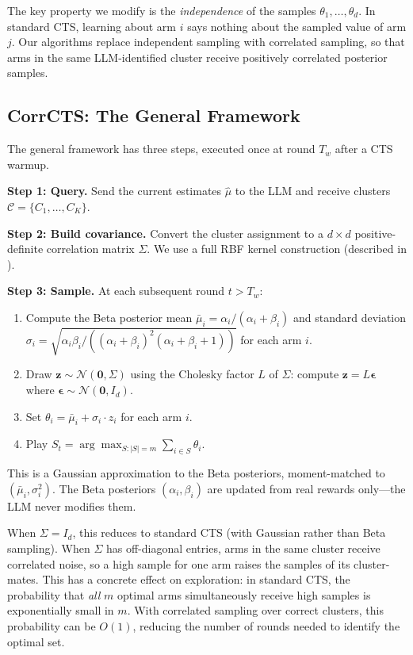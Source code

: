 \documentclass{article}
\theoremstyle{plain}
\theoremstyle{definition}
\theoremstyle{remark}
\begin{document}
The key property we modify is the \emph{independence} of the samples $\theta_1, \ldots, \theta_d$.
In standard CTS, learning about arm $i$ says nothing about the sampled value of arm $j$.
Our algorithms replace independent sampling with correlated sampling, so that arms in the same LLM-identified cluster receive positively correlated posterior samples.

\subsection{CorrCTS: The General Framework}\label{sec:corr-framework}

The general framework has three steps, executed once at round $T_w$ after a CTS warmup.

\textbf{Step 1: Query.}
Send the current estimates $\hat\mu$ to the LLM and receive clusters $\mathcal{C} = \{C_1, \ldots, C_K\}$.

\textbf{Step 2: Build covariance.}
Convert the cluster assignment to a $d \times d$ positive-definite correlation matrix $\Sigma$.
We use a full RBF kernel construction (described in ).

\textbf{Step 3: Sample.}
At each subsequent round $t > T_w$:
\begin{enumerate}
\item Compute the Beta posterior mean $\bar\mu_i = \alpha_i / (\alpha_i + \beta_i)$ and standard deviation $\sigma_i = \sqrt{\alpha_i \beta_i / ((\alpha_i + \beta_i)^2 (\alpha_i + \beta_i + 1))}$ for each arm $i$.
\item Draw $\mathbf{z} \sim \mathcal{N}(\mathbf{0}, \Sigma)$ using the Cholesky factor $L$ of $\Sigma$: compute $\mathbf{z} = L \boldsymbol{\epsilon}$ where $\boldsymbol{\epsilon} \sim \mathcal{N}(\mathbf{0}, I_d)$.
\item Set $\theta_i = \bar\mu_i + \sigma_i \cdot z_i$ for each arm $i$.
\item Play $S_t = \arg\max_{S:|S|=m} \sum_{i \in S} \theta_i$.
\end{enumerate}

This is a Gaussian approximation to the Beta posteriors, moment-matched to $(\bar\mu_i, \sigma_i^2)$.
The Beta posteriors $(\alpha_i, \beta_i)$ are updated from real rewards only---the LLM never modifies them.

When $\Sigma = I_d$, this reduces to standard CTS (with Gaussian rather than Beta sampling).
When $\Sigma$ has off-diagonal entries, arms in the same cluster receive correlated noise, so a high sample for one arm raises the samples of its cluster-mates.
This has a concrete effect on exploration: in standard CTS, the probability that \emph{all} $m$ optimal arms simultaneously receive high samples is exponentially small in $m$.
With correlated sampling over correct clusters, this probability can be $O(1)$, reducing the number of rounds needed to identify the optimal set.
\end{document}
